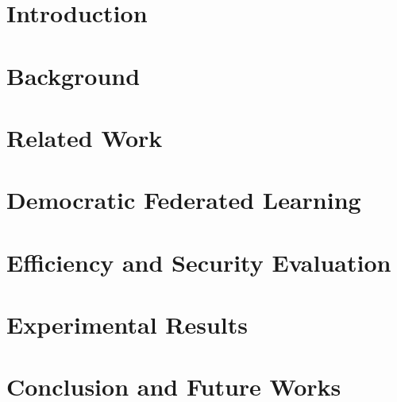 \documentclass[journal]{IEEEtran}
\begin{document}
\section{Introduction} 
\label{sec:intro}


\section{Background}
\label{sec:back}


\section{Related Work}
\label{sec:related}


\section{Democratic Federated Learning}
\label{sec:DemoFL}


\section{Efficiency and Security Evaluation}
\label{sec:eval}


\section{Experimental Results}
\label{sec:exp}


\section{Conclusion and Future Works}
\label{sec:conc}





\end{document}
